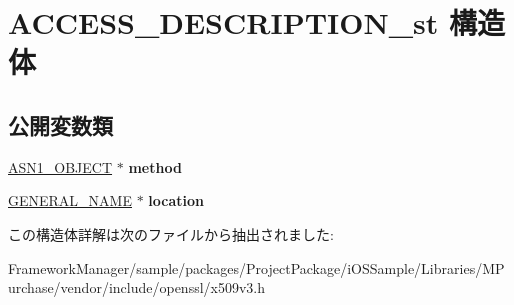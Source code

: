 \hypertarget{struct_a_c_c_e_s_s___d_e_s_c_r_i_p_t_i_o_n__st}{}\section{A\+C\+C\+E\+S\+S\+\_\+\+D\+E\+S\+C\+R\+I\+P\+T\+I\+O\+N\+\_\+st 構造体}
\label{struct_a_c_c_e_s_s___d_e_s_c_r_i_p_t_i_o_n__st}
\subsection*{公開変数類}
\begin{DoxyCompactItemize}
\item 
\hypertarget{struct_a_c_c_e_s_s___d_e_s_c_r_i_p_t_i_o_n__st_afba634277470759ab5ca872db4693fe1}{}\hyperlink{structasn1__object__st}{A\+S\+N1\+\_\+\+O\+B\+J\+E\+C\+T} $\ast$ {\bfseries method}\label{struct_a_c_c_e_s_s___d_e_s_c_r_i_p_t_i_o_n__st_afba634277470759ab5ca872db4693fe1}

\item 
\hypertarget{struct_a_c_c_e_s_s___d_e_s_c_r_i_p_t_i_o_n__st_ae554d8ab9233f6c313c43fc1de26a4ae}{}\hyperlink{struct_g_e_n_e_r_a_l___n_a_m_e__st}{G\+E\+N\+E\+R\+A\+L\+\_\+\+N\+A\+M\+E} $\ast$ {\bfseries location}\label{struct_a_c_c_e_s_s___d_e_s_c_r_i_p_t_i_o_n__st_ae554d8ab9233f6c313c43fc1de26a4ae}

\end{DoxyCompactItemize}


この構造体詳解は次のファイルから抽出されました\+:\begin{DoxyCompactItemize}
\item 
Framework\+Manager/sample/packages/\+Project\+Package/i\+O\+S\+Sample/\+Libraries/\+M\+Purchase/vendor/include/openssl/x509v3.\+h\end{DoxyCompactItemize}
